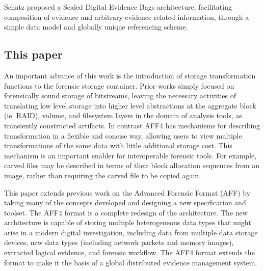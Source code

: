 \documentclass[10pt, conference]{IEEEtran}
\begin{document}

Schatz proposed a Sealed Digital Evidence Bags architecture,
facilitating composition of evidence and arbitrary evidence related
information, through a simple data model and globally unique
referencing scheme\cite{schatz:sdeb}.


\subsection{This paper}
An important advance of this work is the introduction of storage
transformation functions to the forensic storage container. Prior
works simply focused on forensically sound storage of bitstreams,
leaving the necessary activities of translating low level storage into
higher level abstractions at the aggregate block (ie. RAID), volume,
and filesystem layers in the domain of analysis tools, as transiently
constructed artifacts. In contrast AFF4 has mechanisms for describing
transformation in a flexible and concise way, allowing users to view
multiple transformations of the same data with little additional storage
cost. This mechanism is an important enabler for interoperable
forensic tools. For example, carved files may be described in terms of
their block allocation sequences from an image, rather than requiring
the carved file to be copied again.

This paper extends previous work on the Advanced Forensic Format (AFF)
by taking many of the concepts developed and designing a new
specification and toolset. The AFF4 format is a complete redesign of
the architecture. The new architecture is capable of storing multiple
heterogeneous data types that might arise in a modern digital
investigation, including data from multiple data storage devices, new
data types (including network packets and memory images), extracted
logical evidence, and forensic workflow. The AFF4 format extends the
format to make it the basis of a global distributed evidence management system. 
\end{document}
